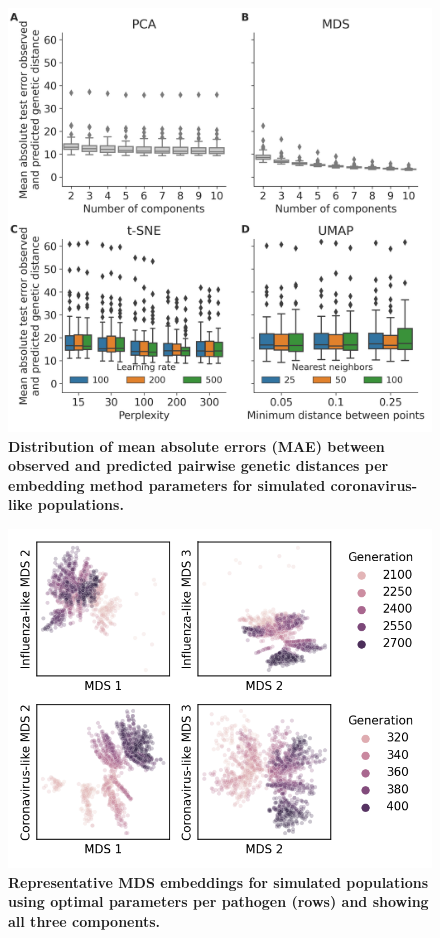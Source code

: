 \begin{figure}[!h]
\includegraphics[width=\columnwidth]{figures/simulated-coronavirus-like-with-moderate-recombination-rate-scores-by-parameters.png}
\caption{{\bf Distribution of mean absolute errors (MAE) between observed and predicted pairwise genetic distances per embedding method parameters for simulated coronavirus-like populations.}}\label{S_Fig_simulated_coronavirus_errors}
\end{figure}

\begin{figure}[!h]
\includegraphics[width=\columnwidth]{figures/simulated-populations-representative-mds-embeddings.png}
\caption{{\bf Representative MDS embeddings for simulated populations using optimal parameters per pathogen (rows) and showing all three components.}}\label{S_Fig_simulated_representative_mds_embeddings}
\end{figure}

